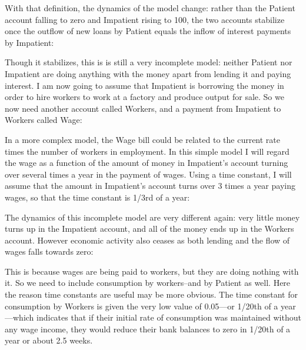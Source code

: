 With that definition, the dynamics of the model change: rather than
the Patient account falling to zero and Impatient rising to 100, the
two accounts stabilize once the outflow of new loans by Patient equals
the inflow of interest payments by Impatient:


Though it stabilizes, this is is still a very incomplete model:
neither Patient nor Impatient are doing anything with the money apart
from lending it and paying interest. I am now going to assume that
Impatient is borrowing the money in order to hire workers to work at a
factory and produce output for sale. So we now need another account
called Workers, and a payment from Impatient to Workers called Wage:


In a more complex model, the Wage bill could be related to the current
rate times the number of workers in employment. In this simple model I
will regard the wage as a function of the amount of money in
Impatient's account turning over several times a year in the payment
of wages. Using a time constant, I will assume that the amount in
Impatient's account turns over 3 times a year paying wages, so that
the time constant is 1/3rd of a year:


The dynamics of this incomplete model are very different again: very
little money turns up in the Impatient account, and all of the money
ends up in the Workers account. However economic activity also ceases
as both lending and the flow of wages falls towards zero:


This is because wages are being paid to workers, but they are doing
nothing with it. So we need to include consumption by workers--and by
Patient as well. Here the reason time constants are useful may be more
obvious. The time constant for consumption by Workers is given the
very low value of 0.05---or 1/20th of a year---which indicates that if
their initial rate of consumption was maintained without any wage
income, they would reduce their bank balances to zero in 1/20th of a
year or about 2.5 weeks.
